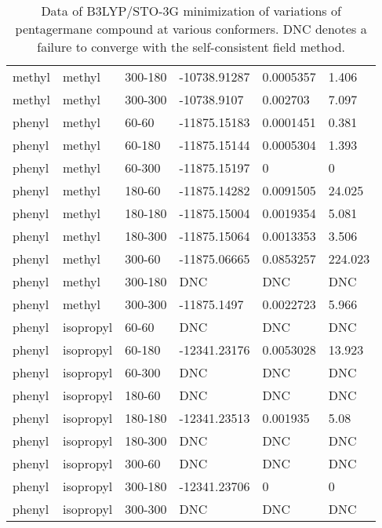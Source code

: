 \begin{table}[]
\begin{tabular}{llllll}
		methyl & methyl & 300-180 & -10738.91287 & 0.0005357 & 1.406 \\
		methyl & methyl & 300-300 & -10738.9107 & 0.002703 & 7.097 \\ \hline
		phenyl & methyl & 60-60 & -11875.15183 & 0.0001451 & 0.381 \\
		phenyl & methyl & 60-180 & -11875.15144 & 0.0005304 & 1.393 \\
		phenyl & methyl & 60-300 & -11875.15197 & 0 & 0 \\
		phenyl & methyl & 180-60 & -11875.14282 & 0.0091505 & 24.025 \\
		phenyl & methyl & 180-180 & -11875.15004 & 0.0019354 & 5.081 \\
		phenyl & methyl & 180-300 & -11875.15064 & 0.0013353 & 3.506 \\
		phenyl & methyl & 300-60 & -11875.06665 & 0.0853257 & 224.023 \\
		phenyl & methyl & 300-180 & DNC & DNC & DNC \\
		phenyl & methyl & 300-300 & -11875.1497 & 0.0022723 & 5.966 \\ \hline
		phenyl & isopropyl & 60-60 & DNC & DNC & DNC \\
		phenyl & isopropyl & 60-180 & -12341.23176 & 0.0053028 & 13.923 \\
		phenyl & isopropyl & 60-300 & DNC & DNC & DNC \\
		phenyl & isopropyl & 180-60 & DNC & DNC & DNC \\
		phenyl & isopropyl & 180-180 & -12341.23513 & 0.001935 & 5.08 \\
		phenyl & isopropyl & 180-300 & DNC & DNC & DNC \\
		phenyl & isopropyl & 300-60 & DNC & DNC & DNC \\
		phenyl & isopropyl & 300-180 & -12341.23706 & 0 & 0 \\
		phenyl & isopropyl & 300-300 & DNC & DNC & DNC
	\end{tabular}
	\caption{Data of B3LYP/STO-3G minimization of variations of pentagermane compound at various conformers. DNC denotes a failure to converge with the self-consistent field method.}
	\label{tab:Ge5Ver2Data}
\end{table}

